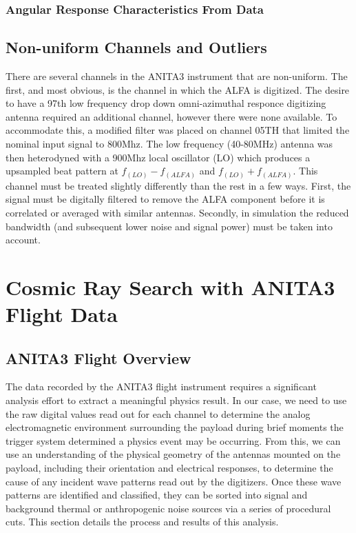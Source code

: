 	\subsection{Angular Response Characteristics From Data}

\section{Non-uniform Channels and Outliers}
	There are several channels in the ANITA3 instrument that are non-uniform.  The first, and most obvious, is the channel in which the ALFA is digitized.  The desire to have a 97th low frequency drop down omni-azimuthal responce digitizing antenna required an additional channel, however there were none available.  To accommodate this, a modified filter was placed on channel 05TH that limited the nominal input signal to 800Mhz.  The low frequency (40-80MHz) antenna was then heterodyned with a 900Mhz local oscillator (LO) which produces a upsampled beat pattern at $f_(LO)-f_(ALFA)$ and $f_(LO)+f_(ALFA)$. This channel must be treated slightly differently than the rest in a few ways.  First, the signal must be digitally filtered to remove the ALFA component before it is correlated or averaged with similar antennas.  Secondly, in simulation the reduced bandwidth (and subsequent lower noise and signal power) must be taken into account.





\chapter{Cosmic Ray Search with ANITA3 Flight Data}
\section{ANITA3 Flight Overview}
	The data recorded by the ANITA3 flight instrument requires a significant analysis effort to extract a meaningful physics result.  In our case, we need to use the raw digital values read out for each channel to determine the analog electromagnetic environment surrounding the payload during brief moments the trigger system determined a physics event may be occurring.  From this, we can use an understanding of the physical geometry of the antennas mounted on the payload, including their orientation and electrical responses, to determine the cause of any incident wave patterns read out by the digitizers.  Once these wave patterns are identified and classified, they can be sorted into signal and background thermal or anthropogenic noise sources via a series of procedural cuts.  This section details the process and results of this analysis.
	
